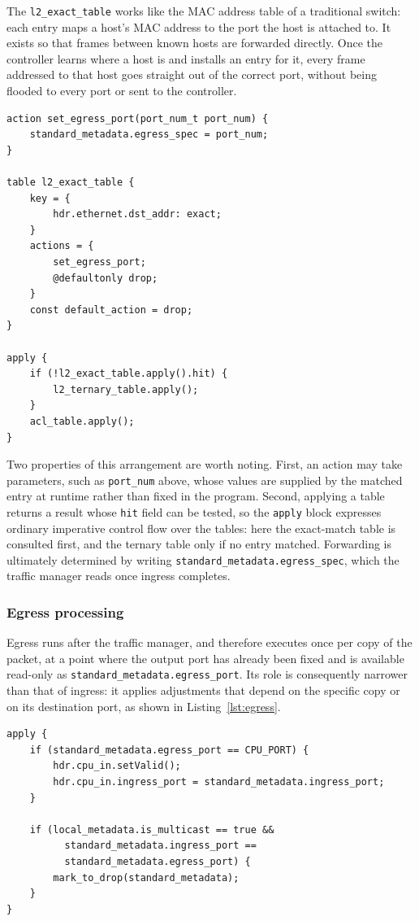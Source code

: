 The \texttt{l2\_exact\_table} works like the MAC address table of a traditional switch: each entry maps a host's MAC address to the port the host is attached to. It exists so that frames between known hosts are forwarded directly. Once the controller learns where a host is and installs an entry for it, every frame addressed to that host goes straight out of the correct port, without being flooded to every port or sent to the controller.

\begin{lstlisting}[caption={An ingress table, its action, and the control flow that applies it.},label={lst:ingress}]
action set_egress_port(port_num_t port_num) {
    standard_metadata.egress_spec = port_num;
}

table l2_exact_table {
    key = {
        hdr.ethernet.dst_addr: exact;
    }
    actions = {
        set_egress_port;
        @defaultonly drop;
    }
    const default_action = drop;
}

apply {
    if (!l2_exact_table.apply().hit) {
        l2_ternary_table.apply();
    }
    acl_table.apply();
}
\end{lstlisting}

Two properties of this arrangement are worth noting. First, an action may take parameters, such as \texttt{port\_num} above, whose values are supplied by the matched entry at runtime rather than fixed in the program. Second, applying a table returns a result whose \texttt{hit} field can be tested, so the \texttt{apply} block expresses ordinary imperative control flow over the tables: here the exact-match table is consulted first, and the ternary table only if no entry matched. Forwarding is ultimately determined by writing \texttt{standard\_metadata.egress\_spec}, which the traffic manager reads once ingress completes.

\subsubsection{Egress processing}
Egress runs after the traffic manager, and therefore executes once per copy of the packet, at a point where the output port has already been fixed and is available read-only as \texttt{standard\_metadata.egress\_port}. Its role is consequently narrower than that of ingress: it applies adjustments that depend on the specific copy or on its destination port, as shown in Listing~\ref{lst:egress}.

\begin{lstlisting}[caption={Egress processing in \texttt{main.p4}.},label={lst:egress}]
apply {
    if (standard_metadata.egress_port == CPU_PORT) {
        hdr.cpu_in.setValid();
        hdr.cpu_in.ingress_port = standard_metadata.ingress_port;
    }

    if (local_metadata.is_multicast == true &&
          standard_metadata.ingress_port ==
          standard_metadata.egress_port) {
        mark_to_drop(standard_metadata);
    }
}
\end{lstlisting}

